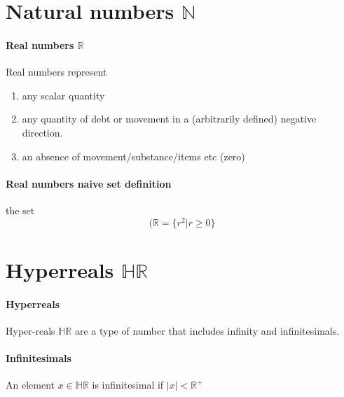 \documentclass[12pt, a4paper,oneside]{book}
\begin{document}
\section{Natural numbers \(\mathbb{N}\)}

\paragraph{Real numbers \(\mathbb{R}\) }
\begin{paragraph}
Real numbers represent \begin{enumerate} 
\item{any scalar quantity} 
\item{any quantity of debt or movement in a (arbitrarily defined) negative direction.} 
\item{an absence of movement/substance/items etc (zero)}
\end{enumerate}
\end{paragraph}


\paragraph{Real numbers naive set definition}
\begin{paragraph}
the set \[(\mathbb{R}=\{ r^2 | r \geq 0\}\] 


\end{paragraph}
\section{Hyperreals \(\mathbb{HR}\)}
\paragraph{Hyperreals}
	\begin{paragraph} Hyper-reals \(\mathbb{HR}\) are a type of number that includes 		infinity and infinitesimals.
    
	
    \end{paragraph}
\paragraph{Infinitesimals}
\begin{paragraph} An element  \(x \in \mathbb{HR}\) is infinitesimal if \(\vert x \vert < \mathbb{R^+}\)
\end{paragraph}
\end{document}
